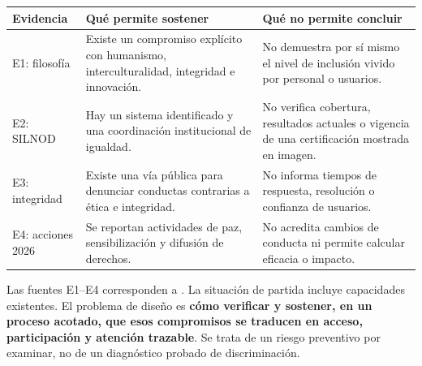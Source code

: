 \documentclass[12pt,letterpaper,oneside]{article}
\begin{document}
\begin{longtable}{@{}L{.12\textwidth}L{.40\textwidth}L{.41\textwidth}@{}}
\toprule \textbf{Evidencia} & \textbf{Qué permite sostener} & \textbf{Qué no permite concluir} \\
\midrule\endhead
E1: filosofía & Existe un compromiso explícito con humanismo, interculturalidad, integridad e innovación. & No demuestra por sí mismo el nivel de inclusión vivido por personal o usuarios. \\
E2: SILNOD & Hay un sistema identificado y una coordinación institucional de igualdad. & No verifica cobertura, resultados actuales o vigencia de una certificación mostrada en imagen. \\
E3: integridad & Existe una vía pública para denunciar conductas contrarias a ética e integridad. & No informa tiempos de respuesta, resolución o confianza de usuarios. \\
E4: acciones 2026 & Se reportan actividades de paz, sensibilización y difusión de derechos. & No acredita cambios de conducta ni permite calcular eficacia o impacto. \\
\bottomrule
\end{longtable}
Las fuentes E1--E4 corresponden a \textcite{fga10filosofia,fga10igualdad,fga10integridad,fga10paz,fga10derechos}. La situación de partida incluye capacidades existentes. El problema de diseño es \textbf{cómo verificar y sostener, en un proceso acotado, que esos compromisos se traducen en acceso, participación y atención trazable}. Se trata de un riesgo preventivo por examinar, no de un diagnóstico probado de discriminación.
\end{document}
